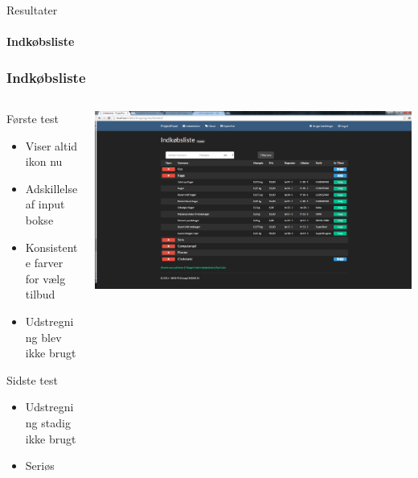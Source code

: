 \begin{frame}{Resultater}
\framesubtitle{Indkøbsliste}
	\subsubsection{Indkøbsliste}
	
	\begin{minipage}[0.3\textheight]{\textwidth}
	\begin{columns}[T]
	\begin{column}{0.5\textwidth}
	 
	 Første test
	 \begin{itemize}
	 	\item Viser altid ikon nu
	 	\item Adskillelse af input bokse
	 	\item Konsistente farver for vælg tilbud
	 	\item Udstregning blev ikke brugt
	 \end{itemize}
	 Sidste test
	 \begin{itemize}
	 	\item Udstregning stadig ikke brugt
	 	\item Seriøs
	 \end{itemize}
	 
	\end{column}
	\begin{column}{0.5\textwidth}
	 \includegraphics[width=1\textwidth,height=1\textheight,keepaspectratio, trim={1cm 0 0 16mm}, clip]{images/Screenshots/ShoppingListOffersOld.png}
	 
	 \vspace{2 mm}
	  

\end{column}
\end{columns}
\end{minipage}
\end{frame}
